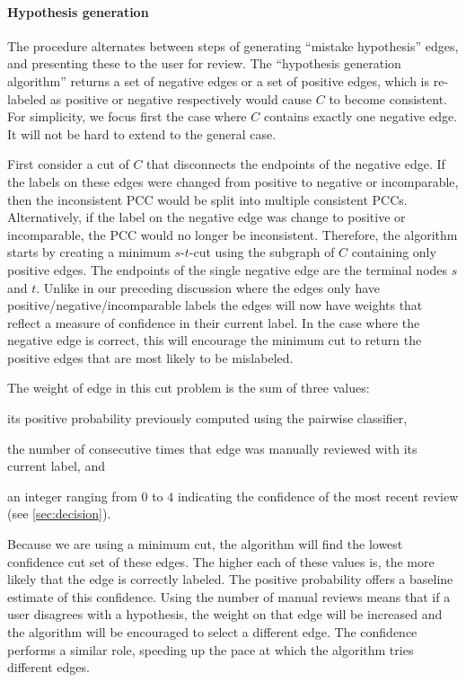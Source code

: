 \inconpcc{}

\paragraph{Hypothesis generation}
The procedure alternates between steps of generating ``mistake hypothesis'' edges, and presenting these to the
  user for review.
The ``hypothesis generation algorithm'' returns a set of negative edges or a set of positive edges, which is
  re-labeled as positive or negative respectively would cause $C$ to become consistent.
For simplicity, we focus first the case where $C$ contains exactly one negative edge.
It will not be hard to extend to the general case.


First consider a cut of $C$ that disconnects the endpoints of the negative edge.
If the labels on these edges were changed from positive to negative or incomparable, then the inconsistent PCC
  would be split into multiple consistent PCCs.
Alternatively, if the label on the negative edge was change to positive or incomparable, the PCC would no longer
  be inconsistent.
Therefore, the algorithm starts by creating a minimum $s$-$t$-cut using the subgraph of $C$ containing only
  positive edges.
The endpoints of the single negative edge are the terminal nodes $s$ and $t$.
Unlike in our preceding discussion where the edges only have positive/negative/incomparable labels the edges will
  now have weights that reflect a measure of confidence in their current label.
In the case where the negative edge is correct, this will encourage the minimum cut to return the positive edges
  that are most likely to be mislabeled.

The weight of edge in this cut problem is the sum of three values:
\begin{enumln}
    \item its positive probability previously computed using the pairwise classifier,

    \item the number of consecutive times that edge was manually reviewed with
        its current label, and

    \item an integer ranging from $0$ to $4$ indicating the confidence of the most recent review (see
      \cref{sec:decision}).
\end{enumln}
Because we are using a minimum cut, the algorithm will find the lowest confidence cut set of these edges.
The higher each of these values is, the more likely that the edge is correctly labeled.
The positive probability offers a baseline estimate of this confidence.
Using the number of manual reviews means that if a user disagrees with a hypothesis, the weight on that edge will
  be increased and the algorithm will be encouraged to select a different edge.
The confidence performs a similar role, speeding up the pace at which the algorithm tries different edges.

